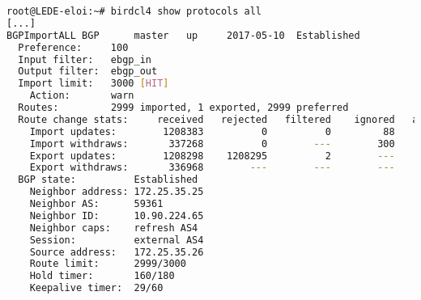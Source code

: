 \begin{lstlisting}[language=bash,caption={UCI Configuration}]
root@LEDE-eloi:~# birdcl4 show protocols all
[...]
BGPImportALL BGP      master   up     2017-05-10  Established
  Preference:     100
  Input filter:   ebgp_in
  Output filter:  ebgp_out
  Import limit:   3000 [HIT]
    Action:       warn
  Routes:         2999 imported, 1 exported, 2999 preferred
  Route change stats:     received   rejected   filtered    ignored   accepted
    Import updates:        1208383          0          0         88    1208295
    Import withdraws:       337268          0        ---        300     336968
    Export updates:        1208298    1208295          2        ---          1
    Export withdraws:       336968        ---        ---        ---          0
  BGP state:          Established
    Neighbor address: 172.25.35.25
    Neighbor AS:      59361
    Neighbor ID:      10.90.224.65
    Neighbor caps:    refresh AS4
    Session:          external AS4
    Source address:   172.25.35.26
    Route limit:      2999/3000
    Hold timer:       160/180
    Keepalive timer:  29/60
\end{lstlisting}